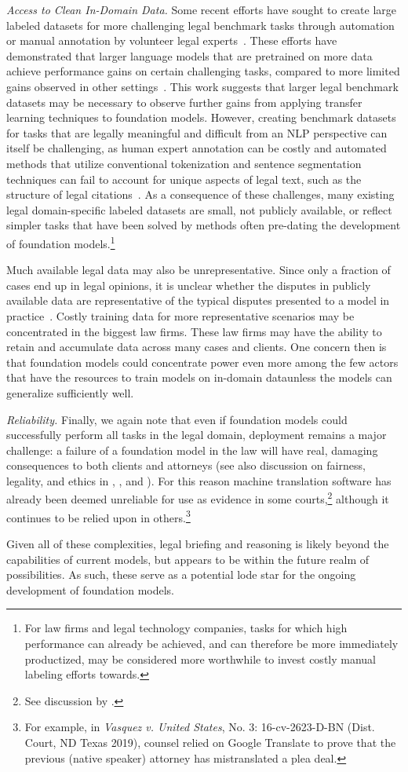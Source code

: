 \emph{Access to Clean In-Domain Data.} Some recent efforts have sought to create large labeled datasets for more challenging legal benchmark tasks through automation~\citep{zheng2021does} or manual annotation by volunteer legal experts~\citep{hendrycks2021cuad}. These efforts have demonstrated that larger language models that are pretrained on more data achieve performance gains on certain challenging tasks, compared to more limited gains observed in other settings~\citep{chalkidis2020legal, elwany2019bert, zhong2020does}. This work suggests that larger legal benchmark datasets may be necessary to observe further gains from applying transfer learning techniques to foundation models. However, creating benchmark datasets for tasks that are legally meaningful and difficult from an NLP perspective can itself be challenging, as human expert annotation can be costly and automated methods that utilize conventional tokenization and sentence segmentation techniques can fail to account for unique aspects of legal text, such as the structure of legal citations~\citep{bommarito2018lexnlp,savelka2017sentence}. As a consequence of these challenges, many existing legal domain-specific labeled datasets are small, not publicly available, or reflect simpler tasks that have been solved by methods often pre-dating the development of foundation models.\footnote{For law firms and legal technology companies, tasks for which high performance can already be achieved, and can therefore be more immediately productized, may be considered more worthwhile to invest costly manual labeling efforts towards.}

Much available legal data may also be unrepresentative. Since only a fraction of cases end up in legal opinions, it is unclear whether the disputes in publicly available data are representative of the typical disputes presented to a model in practice~\citep{priest1984selection}.
Costly training data for more representative scenarios may be concentrated in the biggest law firms.
These law firms may have the ability to retain and accumulate data across many cases and clients. One concern then is that foundation models could concentrate power even more among the few actors that have the resources to train models on in-domain data\dash{}unless the models can generalize sufficiently well.
\medskip

\emph{Reliability.} Finally, we again note that even if foundation models could successfully perform all tasks in the legal domain, deployment remains a major challenge: a failure of a foundation model in the law will have real, damaging consequences to both clients and attorneys (see also discussion on fairness, legality, and ethics in , , and ).
For this reason machine translation software has already been deemed unreliable for use as evidence in some courts,\footnote{See discussion by \citet{vieira2020understanding}.} although it continues to be relied upon in others.\footnote{For example, in \textit{Vasquez v. United States}, No. 3: 16-cv-2623-D-BN (Dist. Court, ND Texas 2019), counsel relied on Google Translate to prove that the previous (native speaker) attorney has mistranslated a plea deal.}

Given all of these complexities, legal briefing and reasoning is likely beyond the capabilities of current models, but appears to be within the future realm of possibilities. As such, these serve as a potential lode star for the ongoing development of foundation models.




